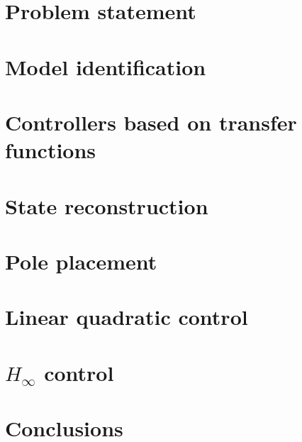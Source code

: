 \documentclass{report}
\begin{document}
	\chapter{Problem statement}
		
	\chapter{Model identification}
		
	\chapter{Controllers based on transfer functions}
		
	\chapter{State reconstruction}
		
	\chapter{Pole placement}
	  	
	\chapter{Linear quadratic control}
		
	\chapter{\boldmath ${H_{\infty}}$ control}
		
	\chapter{Conclusions}
		
\end{document}
